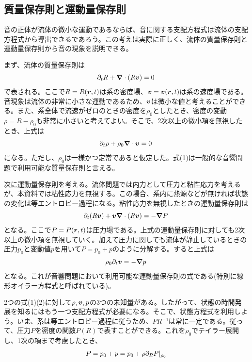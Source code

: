 \documentclass[dvipdfmx, 9pt, a4paper]{jsarticle}
\newcommand{\bm}[1]{{\mbox{\boldmath $#1$}}}
\begin{document}
\subsection{質量保存則と運動量保存則}
音の正体が流体の微小な運動であるならば、音に関する支配方程式は流体の支配方程式から導出できるであろう。この考えは実際に正しく、流体の質量保存則と運動量保存則から音の現象を説明できる。\par
まず、流体の質量保存則は
\begin{equation}
\partial_tR+\bm \nabla \cdot (R\bm v)=0 \notag
\end{equation}
で表される。ここで$R=R(\bm r, t)$は系の密度場、$\bm v=\bm v(\bm r, t)$は系の速度場である。音現象は流体の非常に小さな運動であるため、$\bm v$は微小な値と考えることができる。また、系全体で流速がゼロのときの密度を$\rho_0$としたとき、密度の変動$\rho=R-\rho_0$も非常に小さいと考えてよい。そこで、2次以上の微小項を無視したとき、上式は
\begin{equation}
\partial_t\rho+\rho_0\bm \nabla \cdot \bm v=0
\end{equation}
になる。ただし、$\rho_0$は一様かつ定常であると仮定した。式(1)は一般的な音響問題で利用可能な質量保存則と言える。\par
次に運動量保存則を考える。流体問題では内力として圧力と粘性応力を考えるが、本資料では粘性応力を無視する。この場合、系内に熱源などが無ければ状態の変化は等エントロピー過程になる。粘性応力を無視したときの運動量保存則は
\begin{equation}
\partial_t(R\bm v)+\bm v \bm \nabla \cdot(R\bm v)=-\bm \nabla P \notag 
\end{equation}
となる。ここで$P=P(\bm r, t)$は圧力場である。上式の運動量保存則に対しても2次以上の微小項を無視していく。加えて圧力に関しても流体が静止しているときの圧力$p_0$と変動値$p$を用いて$P=p_0+p$のように分解する。すると上式は
\begin{equation}
\rho_0\partial_t \bm v=-\bm \nabla p
\end{equation}
となる。これが音響問題において利用可能な運動量保存則の式である(特別に線形オイラー方程式と呼ばれている)。\par
2つの式(1)(2)に対して$\rho, \bm v, p$の3つの未知量がある。したがって、状態の時間発展を知るにはもう一つ支配方程式が必要になる。そこで、状態方程式を利用しよう。いま、系は等エントロピー過程に従うため、$PR^{-\gamma}$は常に一定である。従って、圧力$P$を密度の関数$P(R)$で表すことができる。これを$\rho_0$でテイラー展開し、1次の項まで考慮したとき、
\begin{equation}
P=p_0+p=p_0+\rho\partial_RP|_{\rho_0} \notag
\end{equation}
\end{document}
